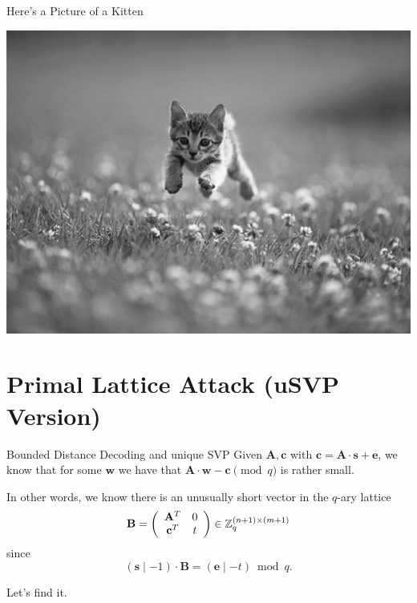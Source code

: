 \documentclass[presentation,smaller]{beamer}
\renewcommand{\vec}[1]{\mathbf{#1}\xspace}
\begin{document}
\begin{frame}[label={sec:org6651f7a}]{Here’s a Picture of a Kitten}
\begin{center}
\includegraphics[width=.9\linewidth]{./kitten-02.jpg}
\end{center}
\end{frame}

\section{Primal Lattice Attack (uSVP Version)}
\label{sec:org439ecac}
\begin{frame}[label={sec:orgfed4275}]{Bounded Distance Decoding and unique SVP}
Given \(\vec{A}, \vec{c}\) with \(\vec{c} = \vec{A} ⋅ \vec{s} + \vec{e}\), we know that for some \(\vec{w}\) we have that \(\vec{A}⋅\vec{w} - \vec{c} \pmod q\) is rather small.

In other words, we know there is an unusually short vector in the \(q\)-ary lattice \[\vec{B}=\left(\begin{array}{cc}
          \vec{A}^T &  0 \\
          \vec{c}^T   & t \\
        \end{array} \right) \in \ZZ_q^{(n+1) \times (m+1)}\] since \[(\vec{s} \mid -1) ⋅ \vec{B} = (\vec{e} \mid -t) \bmod q.\]

Let’s find it.
\end{frame}
\end{document}
